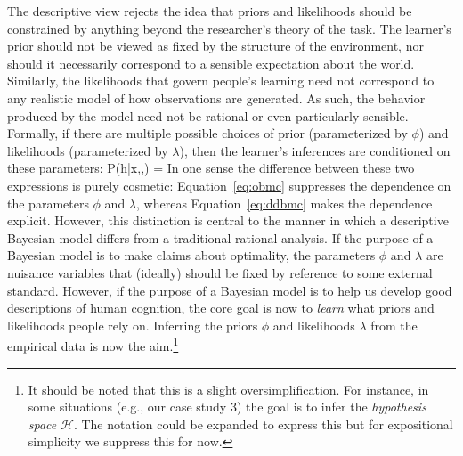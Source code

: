 The descriptive view rejects the idea that priors and likelihoods should be constrained by anything beyond the researcher's theory of the task. The learner's prior should not be viewed as fixed by the structure of the environment, nor should it necessarily correspond to a sensible expectation about the world. Similarly, the likelihoods that govern people's learning need not correspond to any realistic model of how observations are generated. As such, the behavior produced by the model need not be rational or even particularly sensible. Formally, if there are multiple possible choices of prior (parameterized by $\phi$) and likelihoods (parameterized by $\lambda$), then the learner's inferences are conditioned on these parameters:
\be
P(h|x,\lambda,\phi) = 
\label{eq:ddbmc}
\ee
In one sense the difference between these two expressions is purely cosmetic: Equation~\ref{eq:obmc} suppresses the dependence on the parameters $\phi$ and $\lambda$, whereas Equation~\ref{eq:ddbmc} makes the dependence explicit. However, this distinction is central to the manner in which a descriptive Bayesian model differs from a traditional rational analysis. If the purpose of a Bayesian model is to make claims about optimality, the parameters $\phi$ and $\lambda$ are nuisance variables that (ideally) should be fixed by reference to some external standard. However, if the purpose of a Bayesian model is to help us develop good descriptions of human cognition, the core goal is now to {\it learn} what priors and likelihoods people rely on. Inferring the priors $\phi$ and likelihoods $\lambda$ from the empirical data is now the aim.\footnote{It should be noted that this is a slight oversimplification. For instance, in some situations (e.g., our case study 3) the goal is to infer the {\it hypothesis space} $\mathcal{H}$. The notation could be expanded to express this but for expositional simplicity we suppress this for now.} 

